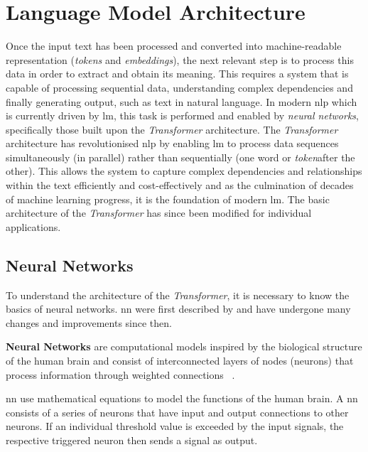 \section{Language Model Architecture}\label{sec:lm_architecture}

Once the input text has been processed and converted into machine-readable representation (\textit{tokens} and \textit{embeddings}), the next relevant step is to process this data in order to extract and obtain its meaning.
%
This requires a system that is capable of processing sequential data, understanding complex dependencies and finally generating output, such as text in natural language.
In modern \ac{nlp} which is currently driven by \ac{lm}, this task is performed and enabled by \textit{neural networks}, specifically those built upon the \textit{Transformer} architecture. 
%
The \textit{Transformer} architecture has revolutionised \ac{nlp} by enabling \ac{lm} to process data sequences simultaneously (in parallel) rather than sequentially (one word or \textit{token}after the other).
This allows the system to capture complex dependencies and relationships within the text efficiently and cost-effectively and as the culmination of decades of machine learning progress, it is the foundation of modern \ac{lm}.
The basic architecture of the \textit{Transformer} has since been modified for individual applications.
%
\subsection{Neural Networks}\label{subsec:nn_prel}

To understand the architecture of the \textit{Transformer}, it is necessary to know the basics of neural networks.
\ac{nn} were first described by \citet{neuronal_networks_first} and have undergone many changes and improvements since then.
\begin{definition}
    \textbf{Neural Networks} are computational models inspired by the biological structure of the human brain and consist of interconnected layers of nodes (neurons) that process information through weighted connections ~\citep{mcculloch1943logical}.
\end{definition}
%
\ac{nn} use mathematical equations to model the functions of the human brain.
A \ac{nn} consists of a series of neurons that have input and output connections to other neurons.
If an individual threshold value is exceeded by the input signals, the respective triggered neuron then sends a signal as output.

